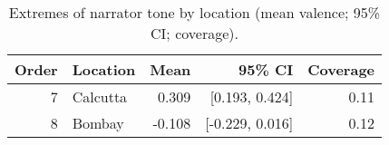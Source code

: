 \begin{table}[!htbp]\centering
\caption{Extremes of narrator tone by location (mean valence; 95\% CI; coverage).}\label{tab:extremes}
\begin{tabular}{rlrrr}
\toprule
Order & Location & Mean & 95\% CI & Coverage\\
\midrule
7 & Calcutta & 0.309 & [0.193, 0.424] & 0.11 \\
8 & Bombay & -0.108 & [-0.229, 0.016] & 0.12 \\
\bottomrule
\end{tabular}
\end{table}
